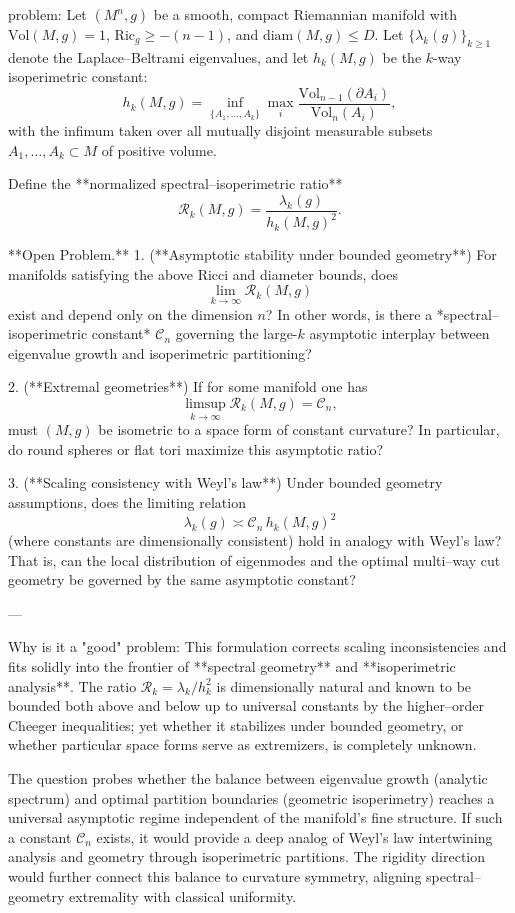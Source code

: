 problem:  
Let \( (M^n,g) \) be a smooth, compact Riemannian manifold with \(\mathrm{Vol}(M,g)=1\), \(\mathrm{Ric}_g \geq -(n-1)\), and \(\mathrm{diam}(M,g)\le D\).  
Let \( \{\lambda_k(g)\}_{k\ge1} \) denote the Laplace–Beltrami eigenvalues, and let \(h_k(M,g)\) be the \(k\)-way isoperimetric constant:  
\[
h_k(M,g) = \inf_{\{A_1,\ldots,A_k\}} \max_i \frac{\mathrm{Vol}_{n-1}(\partial A_i)}{\mathrm{Vol}_n(A_i)} ,
\]
with the infimum taken over all mutually disjoint measurable subsets \(A_1,\dots,A_k\subset M\) of positive volume.

Define the **normalized spectral–isoperimetric ratio**  
\[
\mathcal{R}_k(M,g) = \frac{\lambda_k(g)}{h_k(M,g)^2}.
\]

**Open Problem.**  
1. (**Asymptotic stability under bounded geometry**)  
For manifolds satisfying the above Ricci and diameter bounds, does  
\[
\lim_{k\to\infty} \mathcal{R}_k(M,g)
\]
exist and depend only on the dimension \(n\)?  In other words, is there a *spectral–isoperimetric constant* \(\mathcal{C}_n\) governing the large-\(k\) asymptotic interplay between eigenvalue growth and isoperimetric partitioning?

2. (**Extremal geometries**)  
If for some manifold one has  
\[
\limsup_{k\to\infty} \mathcal{R}_k(M,g) = \mathcal{C}_n,
\]
must \((M,g)\) be isometric to a space form of constant curvature?  In particular, do round spheres or flat tori maximize this asymptotic ratio?

3. (**Scaling consistency with Weyl’s law**)  
Under bounded geometry assumptions, does the limiting relation  
\[
\lambda_k(g) \asymp \mathcal{C}_n\, h_k(M,g)^2
\]
(where constants are dimensionally consistent) hold in analogy with Weyl’s law?  That is, can the local distribution of eigenmodes and the optimal multi–way cut geometry be governed by the same asymptotic constant?

---

Why is it a "good" problem:  
This formulation corrects scaling inconsistencies and fits solidly into the frontier of **spectral geometry** and **isoperimetric analysis**. The ratio \(\mathcal{R}_k=\lambda_k/h_k^2\) is dimensionally natural and known to be bounded both above and below up to universal constants by the higher–order Cheeger inequalities; yet whether it stabilizes under bounded geometry, or whether particular space forms serve as extremizers, is completely unknown.  

The question probes whether the balance between eigenvalue growth (analytic spectrum) and optimal partition boundaries (geometric isoperimetry) reaches a universal asymptotic regime independent of the manifold’s fine structure. If such a constant \(\mathcal{C}_n\) exists, it would provide a deep analog of Weyl’s law intertwining analysis and geometry through isoperimetric partitions. The rigidity direction would further connect this balance to curvature symmetry, aligning spectral–geometry extremality with classical uniformity.  

